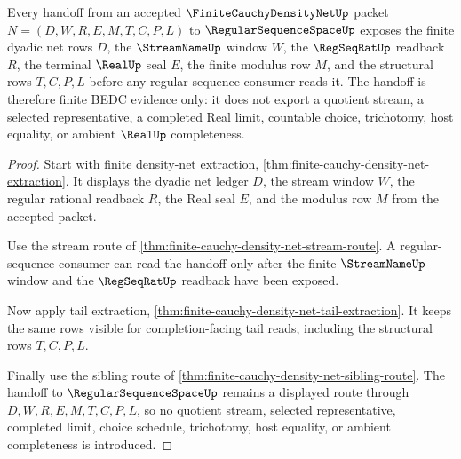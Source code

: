\begin{theorem}
\label{thm:finite-cauchy-density-net-regular-sequence-handoff}
Every handoff from an accepted $\FiniteCauchyDensityNetUp$ packet $N=(D,W,R,E,M,T,C,P,L)$ to $\RegularSequenceSpaceUp$ exposes the finite dyadic net rows $D$, the $\StreamNameUp$ window $W$, the $\RegSeqRatUp$ readback $R$, the terminal $\RealUp$ seal $E$, the finite modulus row $M$, and the structural rows $T,C,P,L$ before any regular-sequence consumer reads it. The handoff is therefore finite BEDC evidence only: it does not export a quotient stream, a selected representative, a completed Real limit, countable choice, trichotomy, host equality, or ambient $\RealUp$ completeness.
\end{theorem}
\begin{proof}
Start with finite density-net extraction, \autoref{thm:finite-cauchy-density-net-extraction}. It displays the dyadic net ledger $D$, the stream window $W$, the regular rational readback $R$, the Real seal $E$, and the modulus row $M$ from the accepted packet.

Use the stream route of \autoref{thm:finite-cauchy-density-net-stream-route}. A regular-sequence consumer can read the handoff only after the finite $\StreamNameUp$ window and the $\RegSeqRatUp$ readback have been exposed.

Now apply tail extraction, \autoref{thm:finite-cauchy-density-net-tail-extraction}. It keeps the same rows visible for completion-facing tail reads, including the structural rows $T,C,P,L$.

Finally use the sibling route of \autoref{thm:finite-cauchy-density-net-sibling-route}. The handoff to $\RegularSequenceSpaceUp$ remains a displayed route through $D,W,R,E,M,T,C,P,L$, so no quotient stream, selected representative, completed limit, choice schedule, trichotomy, host equality, or ambient completeness is introduced.
\end{proof}

